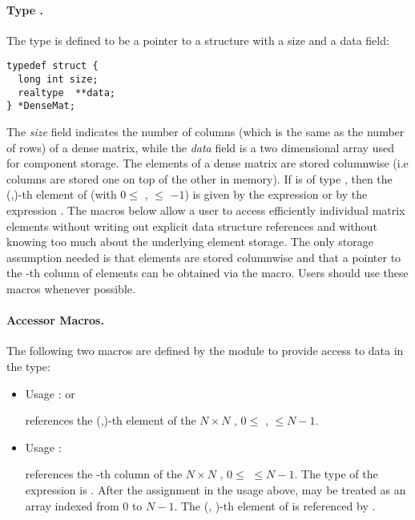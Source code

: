 %
\paragraph{Type .}
The type  is defined to be a pointer to a structure    
with a size and a data field:
\begin{verbatim}
typedef struct {
  long int size;
  realtype  **data;
} *DenseMat;
\end{verbatim}
The {\em size} field indicates the number of columns (which is the same as the
number of rows) of a dense matrix, while the {\em data} field is a two 
dimensional array used for component storage. 
The elements of a dense matrix are stored columnwise (i.e columns are stored 
one on top of the other in memory). If  is of type , 
then the (,)-th element of  
(with $0 \le$ ,  $\le$ $-1$) 
is given by the expression  
or by the expression . The macros below     
allow a user to access efficiently individual matrix           
elements without writing out explicit data structure           
references and without knowing too much about the underlying   
element storage. The only storage assumption needed is that    
elements are stored columnwise and that a pointer to the -th   
column of elements can be obtained via the  macro.    
Users should use these macros whenever possible.               

\paragraph{Accessor Macros.}
The following two macros are defined by the {\dense} module to provide
access to data in the  type:
\begin{itemize}
\item {}
  \par Usage :  or
  \par {} references the (,)-th element of the $N \times N$
   , $0 \le$ ,  $\le N-1$.
  
\item {}
  \par Usage : 
  \par {} references the -th column of the $N \times N$
   , $0 \le$  $\le N-1$. The type of the expression          
   is  . After the assignment in the usage    
  above,  may be treated as an array indexed from $0$ to $N-1$. 
  The (, )-th element of  is referenced by .  
\end{itemize}

